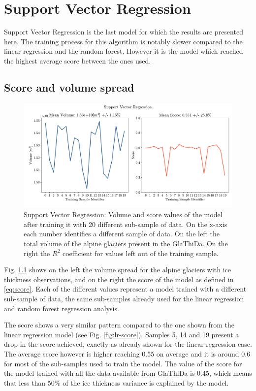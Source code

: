 \section{Support Vector Regression}\label{svr}
Support Vector Regression is the last model for which the results are presented here. The training process for this algorithm is notably slower compared to the linear regression and the random forest. However it is the model which reached the highest average score between the ones used. 

\subsection{Score and volume spread}\label{svr-score}

\begin{figure}[!tp]
	\centering		  
	\includegraphics[width=1.\textwidth]{figures/SVR_score.pdf}
	\caption{Support Vector Regression: Volume and score values of the model after training it with 20 different sub-sample of data. On the x-axis each number identifies a different sample of data. On the left the total volume of the alpine glaciers present in the GlaThiDa. On the right the $R^2$ coefficient for values left out of the training sample.}
	\label{fig:svr-score}
\end{figure}

Fig. \ref{svr-score} shows on the left the volume spread for the alpine glaciers with ice thickness observations, and on the right the score of the model as defined in \ref{eq:score}. Each of the different values represent a model trained with a different sub-sample of data, the same sub-samples already used for the linear regression and random forest regression analysis.

The score shows a very similar pattern compared to the one shown from the linear regression model (see Fig. \ref{fig:lr-score}). Samples 5, 14 and 19 present a drop in the score achieved, exactly as already shown for the linear regression case. The average score however is higher reaching 0.55 on average and it is around 0.6 for most of the sub-samples used to train the model.
The value of the score for the model trained with all the data available from GlaThiDa is 0.45, which means that less than 50\% of the ice thickness variance is explained by the model. 

